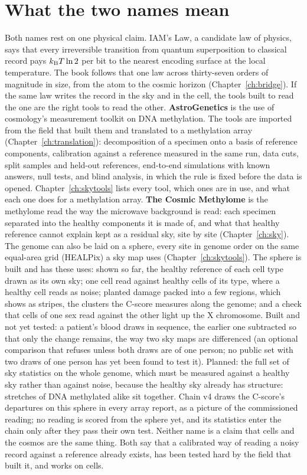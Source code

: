 \section{What the two names mean}\label{sec:ag_names}

Both names rest on one physical claim. IAM's Law, a candidate law of physics, says that every irreversible transition from
quantum superposition to classical record pays $k_{\mathrm B} T\ln2$ per bit to the nearest encoding surface at the local temperature. The book
follows that one law across thirty-seven orders of magnitude in size, from the atom to the cosmic horizon (Chapter~\ref{ch:bridge}). If
the same law writes the record in the sky and in the cell, the tools built to read the one are the right tools to read the other.
\textbf{AstroGenetics} is the use of cosmology's measurement toolkit on DNA methylation. The tools are imported from the field that built
them and translated to a methylation array (Chapter~\ref{ch:translation}): decomposition of a specimen onto a basis of reference
components, calibration against a reference measured in the same run, data cuts, split samples and held-out references, end-to-end
simulations with known answers, null tests, and blind analysis, in which the rule is fixed before the data is opened.
Chapter~\ref{ch:skytools} lists every tool, which ones are in use, and what each one does for a methylation array.
\textbf{The Cosmic Methylome} is the methylome read the way the microwave background is read: each specimen separated into the healthy
components it is made of, and what that healthy reference cannot explain kept as a residual sky, site by site (Chapter~\ref{ch:sky}).
The genome can also be laid on a sphere, every site in genome order on the same equal-area grid (HEALPix) a sky map uses
(Chapter~\ref{ch:skytools}). The sphere is built and has these uses: shown so far, the healthy reference of each cell type drawn as its own
sky; one cell read against healthy cells of its type, where a healthy cell reads as noise; planted damage packed into a few regions, which
shows as stripes, the clusters the C-score measures along the genome; and a check that cells of one sex read against the other light up
the X chromosome. Built and not yet tested: a patient's blood draws in sequence, the earlier one subtracted so that only the change
remains, the way two sky maps are differenced (an optional comparison that refuses unless both draws are of one person; no public set
with two draws of one person has yet been found to test it). Planned: the full set of sky statistics on the whole genome, which must be
measured against a healthy sky rather than against noise, because the healthy sky already has structure: stretches of DNA methylated
alike sit together. Chain v4 draws the C-score's departures on this sphere in every array report, as a picture of the commissioned reading; no reading is scored from the sphere yet, and its statistics enter the chain only after they pass their own test. Neither name is a claim that
cells and the cosmos are the same thing. Both say that a calibrated way of reading a noisy record against a reference already exists,
has been tested hard by the field that built it, and works on cells.

